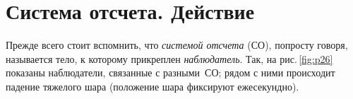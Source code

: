 \documentclass[main.tex]{subfiles}
\begin{document}



 

 

 
   

\section{Система отсчета. Действие}

Прежде всего стоит вспомнить, что \emph{системой отсчета} (СО), попросту говоря, называется тело, к которому прикреплен \emph{наблюдатель}. Так, на рис.\,\ref{fig:p26} показаны наблюдатели, связанные с разными~СО; рядом с ними происходит падение тяжелого шара (положение шара фиксируют ежесекундно).
\end{document}
